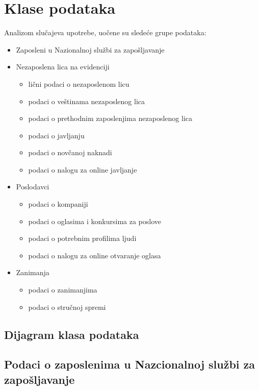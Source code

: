 \section{Klase podataka}

Analizom slu\v cajeva upotrebe, uo\v cene su slede\' ce grupe podataka:

\begin{itemize}
	\item Zaposleni u Nazionalnoj slu\v zbi za zapo\v sljavanje
	\item Nezaposlena lica na evidenciji
		\begin{itemize}
			\item  li\v cni podaci o nezaposlenom licu
			\item podaci o ve\v stinama nezaposlenog lica
			\item podaci o prethodnim zaposlenjima nezaposlenog lica
			\item podaci o javljanju
			\item podaci o nov\v canoj naknadi 
			\item podaci o nalogu za online javljanje
		\end{itemize}
	\item Poslodavci
		\begin{itemize}
			\item podaci o kompaniji
			\item podaci o oglasima i konkursima za poslove
			\item podaci o potrebnim profilima ljudi
			\item podaci o nalogu za online otvaranje oglasa
		\end{itemize}
	\item Zanimanja
		\begin{itemize}
			\item podaci o zanimanjima
			\item podaci o stru\v cnoj spremi
		\end{itemize}
\end{itemize}

\subsection{Dijagram klasa podataka}

\subsection{Podaci o zaposlenima u Nazcionalnoj slu\v zbi za zapo\v sljavanje}

